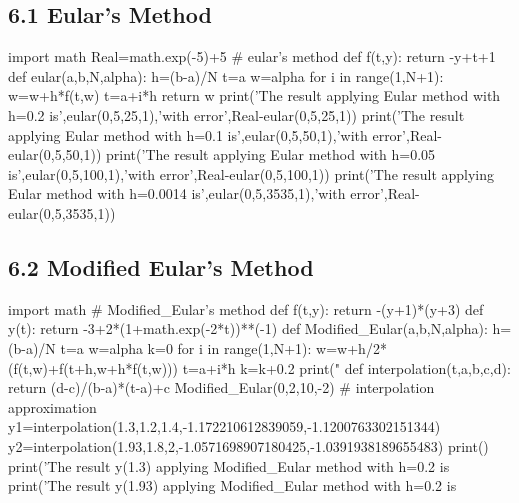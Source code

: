 \documentclass{article}
\begin{document}
    \subsection{6.1 Eular's Method}
    \begin{python}
    import math
    Real=math.exp(-5)+5
    # eular's method
    def f(t,y):
        return -y+t+1
    def eular(a,b,N,alpha):
        h=(b-a)/N
        t=a
        w=alpha
        for i in range(1,N+1):
            w=w+h*f(t,w)
            t=a+i*h
        return w
    print('The result applying Eular method with h=0.2 is',eular(0,5,25,1),'with error',Real-eular(0,5,25,1))
    print('The result applying Eular method with h=0.1 is',eular(0,5,50,1),'with error',Real-eular(0,5,50,1))
    print('The result applying Eular method with h=0.05 is',eular(0,5,100,1),'with error',Real-eular(0,5,100,1))
    print('The result applying Eular method with h=0.0014 is',eular(0,5,3535,1),'with error',Real-eular(0,5,3535,1))
    \end{python}

\subsection{6.2 Modified Eular's Method}   
\begin{python}
import math
# Modified_Eular's method
def f(t,y):
    return -(y+1)*(y+3)
def y(t):
    return -3+2*(1+math.exp(-2*t))**(-1)
def Modified_Eular(a,b,N,alpha):
    h=(b-a)/N
    t=a
    w=alpha
    k=0
    for i in range(1,N+1):
        w=w+h/2*(f(t,w)+f(t+h,w+h*f(t,w)))
        t=a+i*h
        k=k+0.2
        print("%
def interpolation(t,a,b,c,d):
    return (d-c)/(b-a)*(t-a)+c
Modified_Eular(0,2,10,-2)
# interpolation approximation 
y1=interpolation(1.3,1.2,1.4,-1.172210612839059,-1.1200763302151344)
y2=interpolation(1.93,1.8,2,-1.0571698907180425,-1.0391938189655483)
print()
print('The result y(1.3) applying Modified_Eular method with h=0.2 is %
print('The result y(1.93) applying Modified_Eular method with h=0.2 is%
\end{python}
\end{document}
